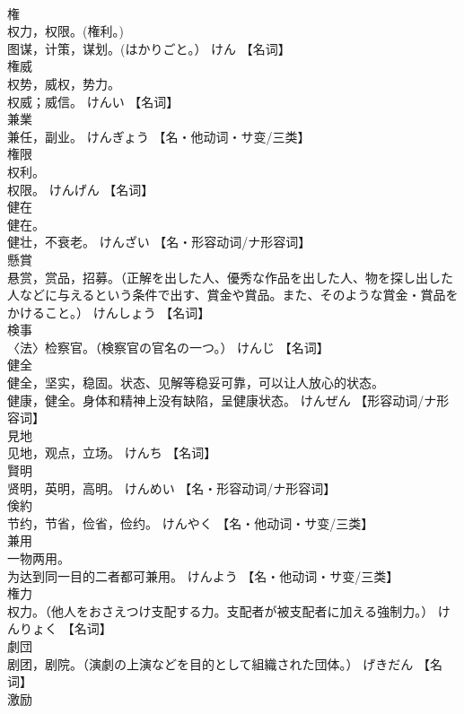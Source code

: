 \documentclass[8pt]{extreport}
\begin{document}
\begin{CJK}{UTF8}{min}
\\	権	
\\	权力，权限。(権利。) 
\\	图谋，计策，谋划。(はかりごと。）	けん		【名词】
\\	権威	
\\	权势，威权，势力。 
\\	权威；威信。	けんい		【名词】
\\	兼業	
\\	兼任，副业。	けんぎょう		【名・他动词・サ变/三类】
\\	権限	
\\	权利。 
\\	权限。	けんげん		【名词】
\\	健在	
\\	健在。 
\\	健壮，不衰老。	けんざい		【名・形容动词/ナ形容词】
\\	懸賞	
\\	悬赏，赏品，招募。（正解を出した人、優秀な作品を出した人、物を探し出した人などに与えるという条件で出す、賞金や賞品。また、そのような賞金・賞品をかけること。）	けんしょう		【名词】
\\	検事	
\\	〈法〉检察官。（検察官の官名の一つ。）	けんじ		【名词】
\\	健全	
\\	健全，坚实，稳固。状态、见解等稳妥可靠，可以让人放心的状态。 
\\	健康，健全。身体和精神上没有缺陷，呈健康状态。	けんぜん		【形容动词/ナ形容词】
\\	見地	
\\	见地，观点，立场。	けんち		【名词】
\\	賢明	
\\	贤明，英明，高明。	けんめい		【名・形容动词/ナ形容词】
\\	倹約	
\\	节约，节省，俭省，俭约。	けんやく		【名・他动词・サ变/三类】
\\	兼用	
\\	一物两用。 
\\	为达到同一目的二者都可兼用。	けんよう		【名・他动词・サ变/三类】
\\	権力	
\\	权力。（他人をおさえつけ支配する力。支配者が被支配者に加える強制力。）	けんりょく		【名词】
\\	劇団	
\\	剧团，剧院。（演劇の上演などを目的として組織された団体。）	げきだん		【名词】
\\	激励	

\end{CJK}
\end{document}
